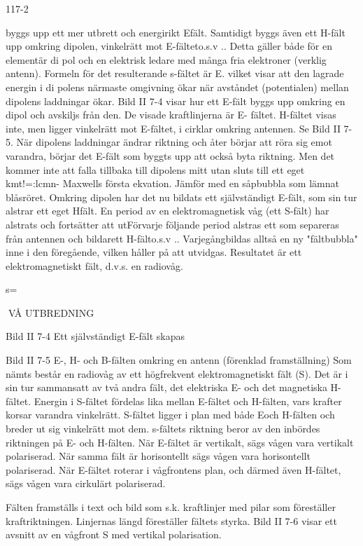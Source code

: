 117-2

byggs upp ett mer utbrett och energirikt Efält. Samtidigt byggs även ett H-fält upp
omkring dipolen, vinkelrätt mot E-fälteto.s.v ..
Detta gäller både för en elementär di pol och
en elektrisk ledare med många fria elektroner (verklig antenn).
Formeln för det resulterande s-fältet är
E. vilket visar att den lagrade energin
i di polens närmaste omgivning ökar när avståndet (potentialen) mellan dipolens laddningar ökar.
Bild II 7-4 visar hur ett E-fält byggs upp
omkring en dipol och avskiljs från den. De
visade kraftlinjerna är E- fältet. H-fältet visas
inte, men ligger vinkelrätt mot E-fältet, i cirklar omkring antennen. Se Bild II 7-5.
När dipolens laddningar ändrar riktning
och åter börjar att röra sig emot varandra,
börjar det E-fält som byggts upp att också
byta riktning. Men det kommer inte att falla
tillbaka till dipolens mitt utan sluts till ett eget
kmt!=:lcmn- Maxwells första ekvation. Jämför
med en såpbubbla som lämnat blåsröret.
Omkring dipolen har det nu bildats ett självständigt E-fält, som sin tur alstrar ett eget Hfält.
En period av en elektromagnetisk våg
(ett S-fält) har alstrats och fortsätter att utFörvarje följande period alstras ett
som separeras från antennen och
bildarett
H-fälto.s.v .. Varjegångbildas
alltså en ny "fältbubbla" inne i den föregående, vilken håller på att utvidgas.
Resultatet är ett elektromagnetiskt fält,
d.v.s. en radiovåg.

s=

VÅ UTBREDNING

Bild II 7-4 Ett självständigt E-fält skapas

Bild II 7-5 E-, H- och B-fälten omkring en antenn (förenklad framställning)
Som nämts består en radiovåg av ett högfrekvent elektromagnetiskt fält (S). Det är i
sin tur sammansatt av två andra fält, det
elektriska E- och det magnetiska H-fältet.
Energin i S-fältet fördelas lika mellan E-fältet
och H-fälten, vars krafter korsar varandra
vinkelrätt. S-fältet ligger i plan med både Eoch H-fälten och breder ut sig vinkelrätt mot
dem. s-fältets riktning beror av den inbördes
riktningen på E- och H-fälten.
När E-fältet är vertikalt, sägs vågen vara
vertikalt polariserad. När samma fält är horisontellt sägs vågen vara horisontellt polariserad. När E-fältet roterar i vågfrontens
plan, och därmed även H-fältet, sägs vågen
vara cirkulärt polariserad.

Fälten framställs i text och bild som s.k.
kraftlinjer med pilar som föreställer kraftriktningen. Linjernas längd föreställer fältets
styrka. Bild II 7-6 visar ett avsnitt av en
vågfront S med vertikal polarisation.
